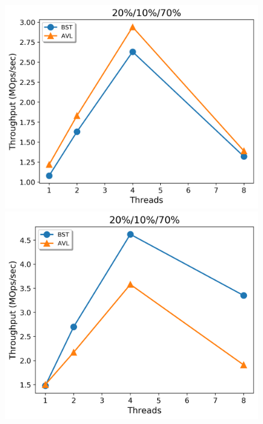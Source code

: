\documentclass[conference]{IEEEtran}
\theoremstyle{definition}
\theoremstyle{theorem}
\begin{document}
\begin{figure}[t]
\begin{minipage}{0.33\textwidth}
 {\includegraphics[width =1\linewidth]{figures/stm1-20-10-70.png}}
 {\includegraphics[width =1\linewidth]{figures/stm2-20-10-70.png}}
\end{minipage}
\begin{minipage}{0.33\textwidth}

\end{minipage}
\end{figure}
\end{document}
